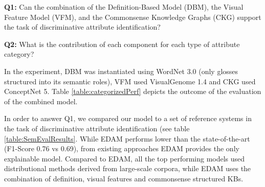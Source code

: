 \documentclass[11pt,a4paper]{article}
\begin{document}
\noindent \textbf{Q1:} Can the combination of the Definition-Based Model (DBM), the Visual Feature Model (VFM), and the Commonsense Knowledge Graphs (CKG) support the task of discriminative attribute identification?

\noindent \textbf{Q2:} What is the contribution of each component for each type of attribute category?



In the experiment, DBM was instantiated using WordNet 3.0 (only glosses structured into its semantic roles), VFM used VisualGenome 1.4 and CKG used ConceptNet 5. Table \ref{table:categorizedPerf} depicts the outcome of the evaluation of the combined model. 









In order to answer Q1, we compared our model to a set of reference systems in the task of discriminative attribute identification (see table \ref{table:SemEvalResults}. While EDAM performs lower than the state-of-the-art (F1-Score 0.76 vs 0.69), from existing approaches EDAM provides the only explainable model. Compared to EDAM, all the top performing models used distributional methods derived from large-scale corpora, while EDAM uses the combination of definition, visual features and commonsense structured KBs.
\end{document}
